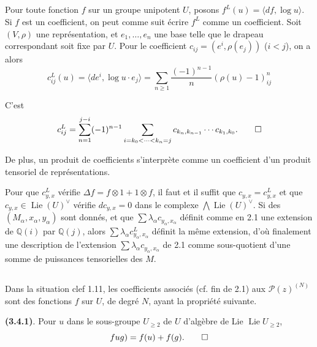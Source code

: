 \documentclass[12pt,a4paper]{article}
\theoremstyle{plain}
\theoremstyle{definition}
\theoremstyle{remark}
\DeclareMathOperator{\Lie}{Lie}
\newcommand{\Q}{\mathbb{Q}}
\begin{document}
\subsection{}

Pour toute fonction $f$ sur un groupe unipotent $U$, posons $f^L(u)=\langle df,\log u\rangle$. Si $f$ est un coefficient, on peut comme suit \'ecrire $f^L$ comme un coefficient. Soit $(V,\rho)$ une repr\'esentation, et $e_1,\ldots,e_n$ une base telle que le drapeau correspondant soit fixe par $U$. Pour le coefficient $c_{ij}=(e^i,\rho(e_j))$ ($i<j$), on a alors
\begin{equation*}
c_{ij}^L(u) = \langle de^i,\log u\cdot e_j\rangle = \sum_{n\geq 1}\frac{(-1)^{n-1}}{n}(\rho(u)-1)^n_{ij}
\end{equation*}

C'est
\begin{equation*}
c_{ij}^L = \sum_{n=1}^{j-i}(-1)^{n-1}\sum_{i=k_0<\cdots<k_n=j}c_{k_n,k_{n-1}}\cdots c_{k_1,k_0}.\qedhere
\end{equation*}

De plus, un produit de coefficients s'interpr\`ete comme un coefficient d'un produit tensoriel de repr\'esentations.

Pour que $c_{y,x}^L$ v\'erifie $\Delta f=f\otimes 1+1\otimes f$, il faut et il suffit que $c_{y,x}=c_{y,x}^L$ et que $c_{y,x}\in\Lie(U)^\vee$ v\'erifie $dc_{y,x}=0$ dans le complexe $\bigwedge\Lie(U)^\vee$. Si des $(M_\alpha,x_\alpha,y_\alpha)$ sont donn\'es, et que $\sum\lambda_\alpha c_{y_\alpha,x_\alpha}$ d\'efinit comme en 2.1 une extension de $\Q(i)$ par $\Q(j)$, alors $\sum\lambda_\alpha c_{y_\alpha,x_\alpha}^L$ d\'efinit la m\^eme extension, d'o\`u finalement une description de l'extension $\sum\lambda_\alpha c_{y_\alpha,x_\alpha}$ de 2.1 comme sous-quotient d'une somme de puissances tensorielles des $M$.

\subsection{}

Dans la situation clef 1.11, les coefficients associ\'es (cf. fin de 2.1) aux $\mathcal{P}(z)^{(N)}$ sont des fonctions $f$ sur $U$, de degr\'e $N$, ayant la propri\'et\'e suivante.

\textbf{(3.4.1)}. Pour $u$ dans le sous-groupe $U_{\geq 2}$ de $U$ d'alg\`ebre de Lie $\Lie U_{\geq 2}$,
\begin{equation*}
 fug) = f(u)+f(g).\qedhere
\end{equation*}
\end{document}
